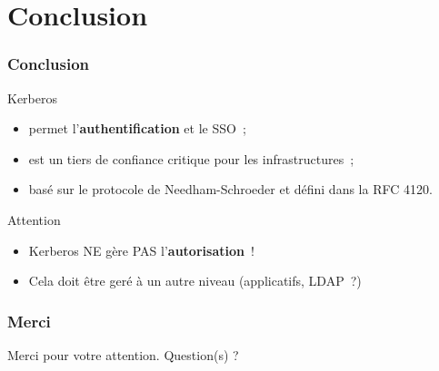 \documentclass[svgnames]{beamer}
\begin{document}

\section*{Conclusion}
\begin{frame}
  \frametitle{Conclusion}
  
\begin{exampleblock}{Kerberos}
  \begin{itemize}
   \item permet l'\textbf{authentification} et le SSO~;
   \item est un tiers de confiance critique pour les infrastructures~;
   \item basé sur le protocole de Needham-Schroeder et défini dans la RFC 4120. 
   \end{itemize}
 \end{exampleblock}
  
 \begin{alertblock}{Attention}
   \begin{itemize}
    \item Kerberos NE gère PAS l'\textbf{autorisation}~!
    \item Cela doit être geré à un autre niveau (applicatifs, LDAP~?)
   \end{itemize}
  \end{alertblock}

\end{frame}


\begin{frame}
  \frametitle{Merci}
  \begin{center}
    Merci pour votre attention. Question(s) ?
  \end{center}
\end{frame}
\end{document}
